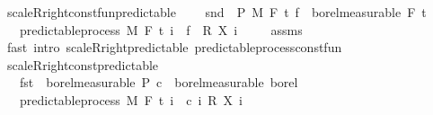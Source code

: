 \begin{isabellebody}
\endisatagproof
{\isafoldproof}%
%
\isadelimproof
\isanewline
%
\endisadelimproof
\isanewline
{}\isamarkupfalse%
\ scaleR{\isacharunderscore}{\kern0pt}right{\isacharunderscore}{\kern0pt}const{\isacharunderscore}{\kern0pt}fun{\isacharunderscore}{\kern0pt}predictable{\isacharcolon}{\kern0pt}\ \isanewline
\ \ \ {\isachardoublequoteopen}snd\ {\isasymin}\ {\isasymSigma}\isactrlsub P\ {\isasymrightarrow}\isactrlsub M\ F\ t\ {\isachardoublequoteopen}f\ {\isasymin}\ borel{\isacharunderscore}{\kern0pt}measurable\ {\isacharparenleft}{\kern0pt}F\ t\ \isanewline
\ \ \ {\isachardoublequoteopen}predictable{\isacharunderscore}{\kern0pt}process\ M\ F\ t\ {\isacharparenleft}{\kern0pt}{\isasymlambda}i\ {\isasymxi}{\isachardot}{\kern0pt}\ f\ {\isasymxi}\ {\isacharasterisk}{\kern0pt}\isactrlsub R\ {\isacharparenleft}{\kern0pt}X\ i\ {\isasymxi}{\isacharparenright}{\kern0pt}{\isacharparenright}{\kern0pt}{\isachardoublequoteclose}\isanewline
%
\isadelimproof
\ \ %
\endisadelimproof
%
\isatagproof
{}\isamarkupfalse%
\ assms\ \isamarkupfalse%
\ {\isacharparenleft}{\kern0pt}fast\ intro{\isacharcolon}{\kern0pt}\ scaleR{\isacharunderscore}{\kern0pt}right{\isacharunderscore}{\kern0pt}predictable\ predictable{\isacharunderscore}{\kern0pt}process{\isacharunderscore}{\kern0pt}const{\isacharunderscore}{\kern0pt}fun{\isacharparenright}{\kern0pt}%
\endisatagproof
{\isafoldproof}%
%
\isadelimproof
\isanewline
%
\endisadelimproof
\isanewline
{}\isamarkupfalse%
\ scaleR{\isacharunderscore}{\kern0pt}right{\isacharunderscore}{\kern0pt}const{\isacharunderscore}{\kern0pt}predictable{\isacharcolon}{\kern0pt}\ \isanewline
\ \ \ {\isachardoublequoteopen}fst\ {\isasymin}\ borel{\isacharunderscore}{\kern0pt}measurable\ {\isasymSigma}\isactrlsub P{\isachardoublequoteclose}\ {\isachardoublequoteopen}c\ {\isasymin}\ borel{\isacharunderscore}{\kern0pt}measurable\ borel{\isachardoublequoteclose}\isanewline
\ \ \ {\isachardoublequoteopen}predictable{\isacharunderscore}{\kern0pt}process\ M\ F\ t\ {\isacharparenleft}{\kern0pt}{\isasymlambda}i\ {\isasymxi}{\isachardot}{\kern0pt}\ c\ i\ {\isacharasterisk}{\kern0pt}\isactrlsub R\ {\isacharparenleft}{\kern0pt}X\ i\ {\isasymxi}{\isacharparenright}{\kern0pt}{\isacharparenright}{\kern0pt}{\isachardoublequoteclose}\ \isanewline
%
\isadelimproof
\ \ %

\end{isabellebody}
